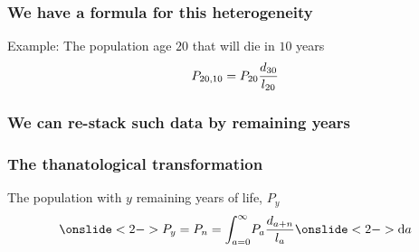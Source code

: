 \documentclass{beamer}
\begin{document}

\begin{frame}
\frametitle{We have a formula for this heterogeneity}
\begin{block}{Example: The population age $20$ that will die in $10$ years}
 \begin{equation}
   P_{20,10} = P_{20} \frac{d_{30}}{l_{20}} \notag
 \end{equation}
 \end{block}
\end{frame}




\begin{frame}
\frametitle{We can re-stack such data by remaining years}
\end{frame}



\begin{frame}
\frametitle{The thanatological transformation}
\begin{block}{The population with $y$ remaining years of life, $P_y$}
 \begin{equation}
   \onslide<2->{P_y = P_{n} = \int_{a=0}^\infty} P_a \frac{d_{a+n}}{l_a}
   \onslide<2->{\mathrm{d} a}
 \end{equation}
 \end{block}
\end{frame}
\end{document}
